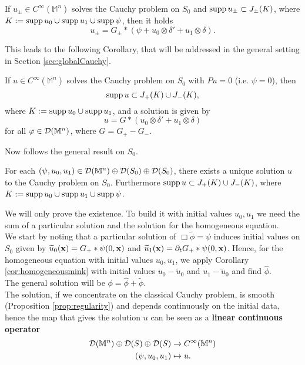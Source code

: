 \begin{theorem}
	If $u_\pm\in C^\infty(\mathbb{M}^n)$ solves the Cauchy problem on $S_0$ and $\text{supp}\,u_\pm\subset J_\pm(K)$, where $K:=\text{supp}\, u_0\cup\text{supp}\,u_1\cup\text{supp}\,\psi$, then it holds
	\begin{equation}
		u_\pm=G_\pm*(\psi+u_0\otimes\delta'+u_1\otimes\delta).
	\end{equation}
	\label{th:deltaprimo}
\end{theorem}

\noindent This leads to the following Corollary, that will be addressed in the general setting in Section \ref{sec:globalCauchy}.

\begin{cor}
	If $u\in C^\infty(\mathbb{M}^n)$ solves the Cauchy problem on $S_0$ with $Pu=0$ (i.e. $\psi=0$), then
	\[\text{supp}\,u\subset J_+(K)\cup J_-(K),\]
	where $K:=\text{supp}\,u_0\cup\text{supp}\,u_1$, and a solution is given by
	\begin{equation}
u=G*(u_0\otimes\delta'+u_1\otimes\delta)
\end{equation}
	for all $\varphi\in\mathcal{D}(\mathbb{M}^n)$, where $G=G_+-G_-$.
	\label{cor:homogeneousmink}
\end{cor}




\noindent Now follows the general result on $S_0$.
\begin{theorem}
	For each $(\psi,u_0,u_1)\in\mathcal{D}(\mathbb{M}^n)\oplus\mathcal{D}(S_0)\oplus\mathcal{D}(S_0)$, there exists a unique solution $u$ to the Cauchy problem on $S_0$. Furthermore $\text{supp}\,u\subset J_+(K)\cup J_-(K)$, where $K:=\text{supp}\, u_0\cup\text{supp}\,u_1\cup\text{supp}\,\psi$.
\end{theorem}
\Proof We will only prove the existence. To build it with initial values $u_0,u_1$ we need the sum of a particular solution and the solution for the homogeneous equation.\\
We start by noting that a particular solution of $\Box\widetilde{\phi}=\psi$ induces initial values on $S_0$ given by $\widetilde{u}_0(\mathbf{x})=G_+*\psi(0,\mathbf{x})$ and $\widetilde{u}_1(\mathbf{x})=\partial_t G_+*\psi(0,\mathbf{x})$. Hence, for the homogeneous equation with initial values $u_0,u_1$, we apply Corollary \ref{cor:homogeneousmink} with initial values $u_0-\widetilde{u}_0$ and $u_1-\widetilde{u}_0$ and find $\widehat{\phi}$.\\
The general solution will be $\phi=\widehat{\phi}+\widetilde{\phi}$.\endproof\\





\noindent The solution, if we concentrate on the classical Cauchy problem, is smooth (Proposition \ref{prop:regularity}) and depends continuously on the initial data, hence the map that gives the solution $u$ can be seen as a \textbf{linear continuous operator}
\begin{equation*}
\begin{aligned}
\mathcal{D}(\mathbb{M}^n)\oplus\mathcal{D}(S)\oplus\mathcal{D}(S)&\to C^{\infty}(\mathbb{M}^n)\\
(\psi,u_0,u_1)&\mapsto u.
\end{aligned}
\end{equation*}


